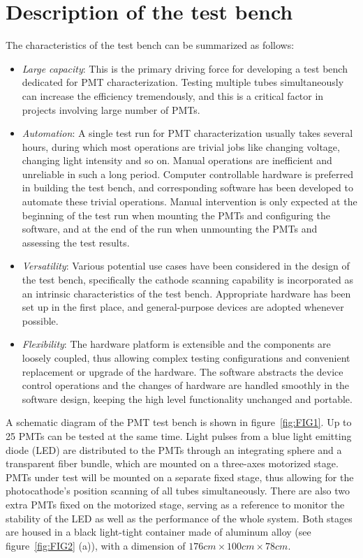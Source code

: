 \documentclass{JINST}
\begin{document}
\section{Description of the test bench}
\label{sec:description}

The characteristics of the test bench can be summarized as follows:
\begin{itemize}
	\item \textit{Large capacity}: This is the primary driving force for developing a test bench dedicated for PMT characterization.
	Testing multiple tubes simultaneously can increase the efficiency tremendously, and this is a critical factor in projects involving large number of PMTs. 
	\item \textit{Automation}: A single test run for PMT characterization usually takes several hours, during which most operations are trivial jobs like changing voltage, changing light intensity and so on.
	Manual operations are inefficient and unreliable in such a long period.
	Computer controllable hardware is preferred in building the test bench, and corresponding software has been developed to automate these trivial operations.
	Manual intervention is only expected at the beginning of the test run when mounting the PMTs and configuring the software, and at the end of the run when unmounting the PMTs and assessing the test results.
	\item \textit{Versatility}: Various potential use cases have been considered in the design of the test bench, specifically the cathode scanning capability is incorporated as an intrinsic characteristics of the test bench.
	Appropriate hardware has been set up in the first place, and general-purpose devices are adopted whenever possible.
	\item \textit{Flexibility}: %
	The hardware platform is extensible and the components are loosely coupled, thus allowing complex testing configurations and convenient replacement or upgrade of the hardware.
	The software abstracts the device control operations and the changes of hardware are handled smoothly in the software design, keeping the high level functionality unchanged and portable. 
\end{itemize}

A schematic diagram of the PMT test bench is shown in figure~\ref{fig:FIG1}.
Up to 25 PMTs can be tested at the same time.
Light pulses from a blue light emitting diode (LED) are distributed to the PMTs through an integrating sphere and a transparent fiber bundle, which are mounted on a three-axes motorized stage.
PMTs under test will be mounted on a separate fixed stage, thus allowing for the photocathode's position scanning of all tubes simultaneously.
There are also two extra PMTs fixed on the motorized stage, serving as a reference to monitor the stability of the LED as well as the performance of the whole system.
Both stages are housed in a black light-tight container made of aluminum alloy (see figure~\ref{fig:FIG2} (a)), with a dimension of $176cm\times100cm\times78cm$.
\end{document}
